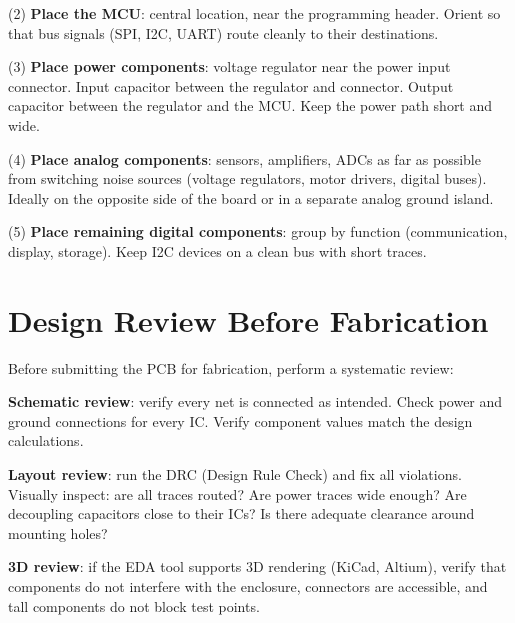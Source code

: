 (2) \textbf{Place the MCU}: central location, near the programming header. Orient so that bus signals (SPI, I2C, UART) route cleanly to their destinations.

(3) \textbf{Place power components}: voltage regulator near the power input connector. Input capacitor between the regulator and connector. Output capacitor between the regulator and the MCU. Keep the power path short and wide.

(4) \textbf{Place analog components}: sensors, amplifiers, ADCs as far as possible from switching noise sources (voltage regulators, motor drivers, digital buses). Ideally on the opposite side of the board or in a separate analog ground island.

(5) \textbf{Place remaining digital components}: group by function (communication, display, storage). Keep I2C devices on a clean bus with short traces.

\section{Design Review Before Fabrication}
Before submitting the PCB for fabrication, perform a systematic review:

\textbf{Schematic review}: verify every net is connected as intended. Check power and ground connections for every IC. Verify component values match the design calculations.

\textbf{Layout review}: run the DRC (Design Rule Check) and fix all violations. Visually inspect: are all traces routed? Are power traces wide enough? Are decoupling capacitors close to their ICs? Is there adequate clearance around mounting holes?

\textbf{3D review}: if the EDA tool supports 3D rendering (KiCad, Altium), verify that components do not interfere with the enclosure, connectors are accessible, and tall components do not block test points.

